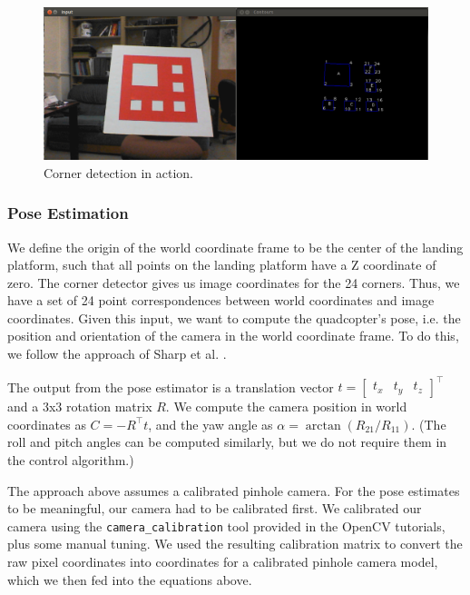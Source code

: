 \documentclass[10pt]{scrartcl} %
\begin{document}
\begin{figure}[h]
    \centering
    \includegraphics[width=\textwidth]{images/corners.png}
    \caption{Corner detection in action.}
    \label{fig:corners}
\end{figure}

\subsubsection{Pose Estimation}

We define the origin of the world coordinate frame to be the center of the
landing platform, such that all points on the landing platform have a Z
coordinate of zero. The corner detector gives us image coordinates for the 24
corners. Thus, we have a set of 24 point correspondences between world
coordinates and image coordinates. Given this input, we want to compute the
quadcopter's pose, i.e. the position and orientation of the camera in the world
coordinate frame. To do this, we follow the approach of Sharp et al.
\cite{sharp_et_al_2001}.


The output from the pose estimator is a translation vector
$t = \begin{bmatrix} t_x & t_y & t_z \end{bmatrix}^\top$
and a 3x3 rotation matrix $R$. We compute the camera position in world
coordinates as $C = -R^\top t$, and the yaw angle as
$\alpha = \arctan(R_{21} / R_{11})$. (The roll and pitch angles can be computed
similarly, but we do not require them in the control algorithm.)

The approach above assumes a calibrated pinhole camera. For the pose estimates
to be meaningful, our camera had to be calibrated first. We calibrated our
camera using the {\tt camera\_calibration} tool provided in the OpenCV
tutorials, plus some manual tuning. We used the resulting calibration matrix to
convert the raw pixel coordinates into coordinates for a calibrated pinhole
camera model, which we then fed into the equations above.
\end{document}
